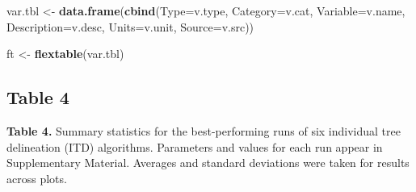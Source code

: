\documentclass[
  12pt,
]{article}
\newenvironment{Shaded}{\begin{snugshade}}{\end{snugshade}}
\newcommand{\FunctionTok}[1]{\textcolor[rgb]{0.13,0.29,0.53}{\textbf{#1}}}
\newcommand{\NormalTok}[1]{#1}
\newcommand{\OtherTok}[1]{\textcolor[rgb]{0.56,0.35,0.01}{#1}}
\newcommand{\StringTok}[1]{\textcolor[rgb]{0.31,0.60,0.02}{#1}}
\begin{document}
\begin{Shaded}
\begin{Highlighting}[]
\NormalTok{var.tbl }\OtherTok{\textless{}{-}} \FunctionTok{data.frame}\NormalTok{(}\FunctionTok{cbind}\NormalTok{(}\StringTok{\textquotesingle{}Type\textquotesingle{}}\OtherTok{=}\NormalTok{v.type, }\StringTok{\textquotesingle{}Category\textquotesingle{}}\OtherTok{=}\NormalTok{v.cat, }
                            \StringTok{\textquotesingle{}Variable\textquotesingle{}}\OtherTok{=}\NormalTok{v.name, }\StringTok{\textquotesingle{}Description\textquotesingle{}}\OtherTok{=}\NormalTok{v.desc, }
                            \StringTok{\textquotesingle{}Units\textquotesingle{}}\OtherTok{=}\NormalTok{v.unit, }\StringTok{\textquotesingle{}Source\textquotesingle{}}\OtherTok{=}\NormalTok{v.src))}

\NormalTok{ft }\OtherTok{\textless{}{-}} \FunctionTok{flextable}\NormalTok{(var.tbl)}
\end{Highlighting}
\end{Shaded}

\clearpage

\newpage

\subsection{Table 4}\label{table-4}

\textbf{Table 4.} Summary statistics for the best-performing runs of six
individual tree delineation (ITD) algorithms. Parameters and values for
each run appear in Supplementary Material. Averages and standard
deviations were taken for results across plots.
\end{document}
